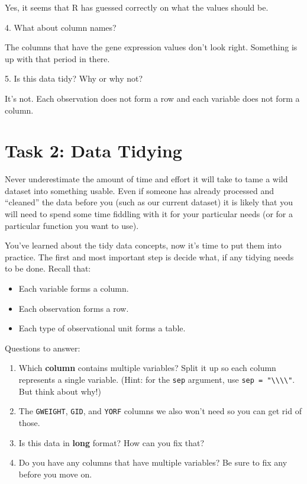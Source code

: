 \documentclass[
]{book}
\providecommand{\tightlist}{%
  \setlength{\itemsep}{0pt}\setlength{\parskip}{0pt}}
\begin{document}
Yes, it seems that R has guessed correctly on what the values should be.

4. What about column names?

The columns that have the gene expression values don't look right. Something is up with that period in there.

5. Is this data tidy? Why or why not?

It's not. Each observation does not form a row and each variable does not form a column.

\hypertarget{task-2-data-tidying}{%
\section*{Task 2: Data Tidying}\label{task-2-data-tidying}}

Never underestimate the amount of time and effort it will take to tame a wild dataset into something usable. Even if someone has already processed and ``cleaned'' the data before you (such as our current dataset) it is likely that you will need to spend some time fiddling with it for your particular needs (or for a particular function you want to use).

You've learned about the tidy data concepts, now it's time to put them into practice. The first and most important step is decide what, if any tidying needs to be done. Recall that:

\begin{itemize}
\tightlist
\item
  Each variable forms a column.
\item
  Each observation forms a row.
\item
  Each type of observational unit forms a table.
\end{itemize}

Questions to answer:

\begin{enumerate}
\def\labelenumi{\arabic{enumi}.}
\tightlist
\item
  Which \textbf{column} contains multiple variables? Split it up so each column represents a single variable. (Hint: for the \texttt{sep} argument, use \texttt{sep\ =\ "\textbackslash{}\textbackslash{}\textbar{}\textbackslash{}\textbackslash{}\textbar{}"}. But think about why!)
\item
  The \texttt{GWEIGHT}, \texttt{GID}, and \texttt{YORF} columns we also won't need so you can get rid of those.
\item
  Is this data in \textbf{long} format? How can you fix that?
\item
  Do you have any columns that have multiple variables? Be sure to fix any before you move on.
\end{enumerate}
\end{document}
